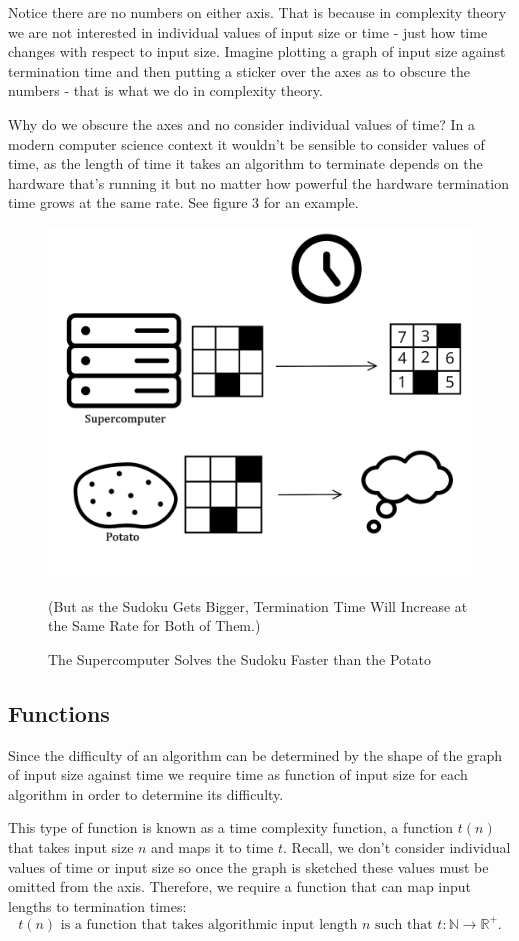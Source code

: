 \documentclass[twoside,10pt]{article}
\begin{document}
Notice there are no numbers on either axis. That is because in complexity theory we are not interested in individual values of input size or time - just how time changes with respect to input size. Imagine plotting a graph of input size against termination time and then putting a sticker over the axes as to obscure the numbers - that is what we do in complexity theory.

Why do we obscure the axes and no consider individual values of time? In a modern computer science context it wouldn't be sensible to consider values of time, as the length of time it takes an algorithm to terminate depends on the hardware that's running it but no matter how powerful the hardware termination time grows at the same rate. See figure 3 for an example.

\begin{figure}[H]
    \centering
    \includegraphics[width=0.5\linewidth]{HardwareTime.png}
    \caption{The Supercomputer Solves the Sudoku Faster than the Potato}
    (But as the Sudoku Gets Bigger, Termination Time Will Increase at the Same Rate for Both of Them.)
    \label{fig:hardware}
\end{figure}


\subsection{Functions}
Since the difficulty of an algorithm can be determined by the shape of the graph of input size against time we require time as function of input size for each algorithm in order to determine its difficulty.

This type of function is known as a time complexity function, a function $t(n)$ that takes input size $n$ and maps it to time $t$. Recall, we don't consider individual values of time or input size so once the graph is sketched these values must be omitted from the axis. Therefore, we require a function that can map input lengths to termination times:
\[t(n) \text{ is a function that takes algorithmic input length $n$ such that }t:\mathbb{N}\rightarrow\mathbb{R}^+.\]
\end{document}
